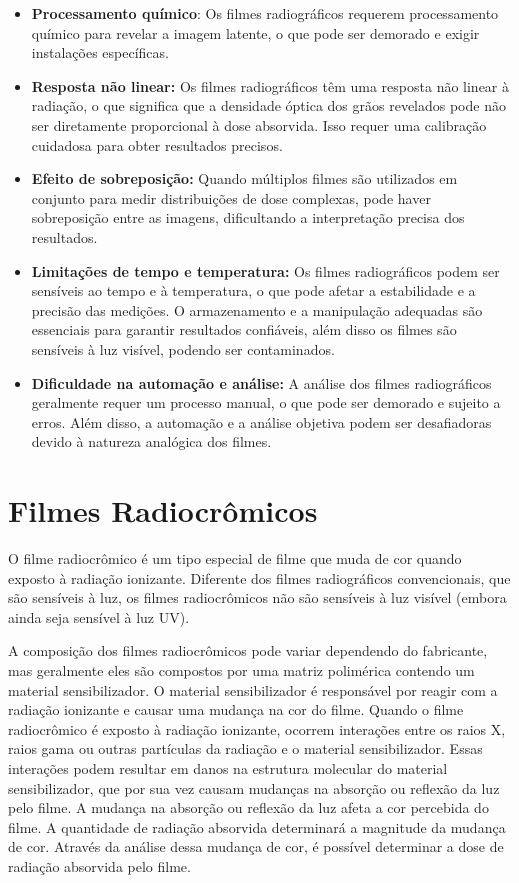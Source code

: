 \documentclass[11pt,a4paper]{article}
\begin{document}
		\begin{itemize}[label=\textcolor{CarnationPink}{$\blacktriangleright$}]
			\item \textbf{Processamento químico}: Os filmes radiográficos requerem processamento químico para revelar a imagem latente, o que pode ser demorado e exigir instalações específicas.
			\item \textbf{Resposta não linear:} Os filmes radiográficos têm uma resposta não linear à radiação, o que significa que a densidade óptica dos grãos revelados pode não ser diretamente proporcional à dose absorvida. Isso requer uma calibração cuidadosa para obter resultados precisos.
			\item \textbf{Efeito de sobreposição:} Quando múltiplos filmes são utilizados em conjunto para medir distribuições de dose complexas, pode haver sobreposição entre as imagens, dificultando a interpretação precisa dos resultados.
			\item \textbf{Limitações de tempo e temperatura:} Os filmes radiográficos podem ser sensíveis ao tempo e à temperatura, o que pode afetar a estabilidade e a precisão das medições. O armazenamento e a manipulação adequadas são essenciais para garantir resultados confiáveis, além disso os filmes são sensíveis à luz visível, podendo ser contaminados.
			\item \textbf{Dificuldade na automação e análise:} A análise dos filmes radiográficos geralmente requer um processo manual, o que pode ser demorado e sujeito a erros. Além disso, a automação e a análise objetiva podem ser desafiadoras devido à natureza analógica dos filmes.
		\end{itemize}

	\section{Filmes Radiocrômicos}

		O filme radiocrômico é um tipo especial de filme que muda de cor quando exposto à radiação ionizante. Diferente dos filmes radiográficos convencionais, que são sensíveis à luz, os filmes radiocrômicos não são sensíveis à luz visível (embora ainda seja sensível à luz UV).

		A composição dos filmes radiocrômicos pode variar dependendo do fabricante, mas geralmente eles são compostos por uma matriz polimérica contendo um material sensibilizador. O material sensibilizador é responsável por reagir com a radiação ionizante e causar uma mudança na cor do filme. Quando o filme radiocrômico é exposto à radiação ionizante, ocorrem interações entre os raios X, raios gama ou outras partículas da radiação e o material sensibilizador. Essas interações podem resultar em danos na estrutura molecular do material sensibilizador, que por sua vez causam mudanças na absorção ou reflexão da luz pelo filme. A mudança na absorção ou reflexão da luz afeta a cor percebida do filme. A quantidade de radiação absorvida determinará a magnitude da mudança de cor. Através da análise dessa mudança de cor, é possível determinar a dose de radiação absorvida pelo filme.
\end{document}

